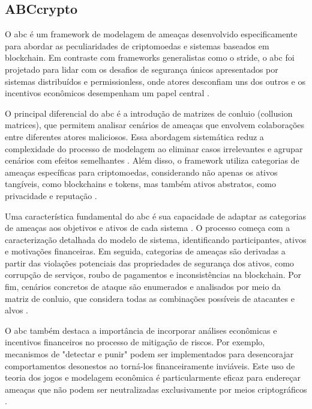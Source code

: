 \subsection{ABCcrypto}
\label{subsec:abccrypto}

O \gls{abc} é um framework de modelagem de
ameaças desenvolvido especificamente para abordar as peculiaridades de
criptomoedas e sistemas baseados em blockchain. Em contraste com
frameworks generalistas como o \gls{stride}, o \gls{abc} foi projetado para lidar
com os desafios de segurança únicos apresentados por sistemas
distribuídos e permissionless, onde atores desconfiam uns dos outros e
os incentivos econômicos desempenham um papel central
\cite{AbcCrypto}.

O principal diferencial do \gls{abc} é a introdução de matrizes de conluio
(collusion matrices), que permitem analisar cenários de ameaças que
envolvem colaborações entre diferentes atores maliciosos. Essa
abordagem sistemática reduz a complexidade do processo de modelagem ao
eliminar casos irrelevantes e agrupar cenários com efeitos
semelhantes \cite{AbcCrypto}. Além disso, o framework utiliza categorias de ameaças
específicas para criptomoedas, considerando não apenas os ativos
tangíveis, como blockchains e tokens, mas também ativos abstratos,
como privacidade e reputação \cite{AbcCrypto}.

Uma característica fundamental do \gls{abc} é sua capacidade de adaptar as
categorias de ameaças aos objetivos e ativos de cada sistema \cite{AbcCrypto}. O
processo começa com a caracterização detalhada do modelo de sistema,
identificando participantes, ativos e motivações financeiras. Em
seguida, categorias de ameaças são derivadas a partir das violações
potenciais das propriedades de segurança dos ativos, como corrupção de
serviços, roubo de pagamentos e inconsistências na blockchain. Por
fim, cenários concretos de ataque são enumerados e analisados por meio
da matriz de conluio, que considera todas as combinações possíveis de
atacantes e alvos \cite{AbcCrypto}.

O \gls{abc} também destaca a importância de incorporar análises econômicas e
incentivos financeiros no processo de mitigação de riscos. Por
exemplo, mecanismos de "detectar e punir" podem ser implementados para
desencorajar comportamentos desonestos ao torná-los financeiramente
inviáveis. Este uso de teoria dos jogos e modelagem econômica é
particularmente eficaz para endereçar ameaças que não podem ser
neutralizadas exclusivamente por meios criptográficos
\cite{AbcCrypto}.

